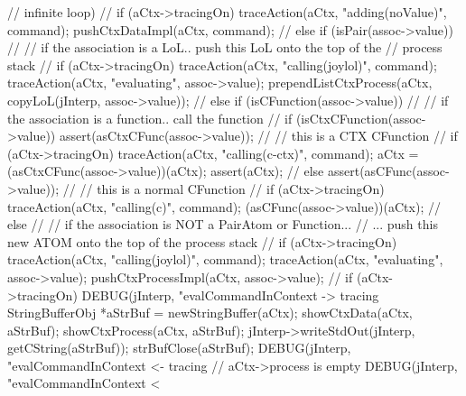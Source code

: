{{{{        // infinite loop)
        //
        if (aCtx->tracingOn)
          traceAction(aCtx, "adding(noValue)", command);
        pushCtxDataImpl(aCtx, command);
        //
      } else if (isPair(assoc->value)) {
        //
        // if the association is a LoL.. push this LoL onto the top of the
        // process stack
        //
        if (aCtx->tracingOn) {
          traceAction(aCtx, "calling(joylol)", command);
          traceAction(aCtx, "evaluating", assoc->value);
        }
        prependListCtxProcess(aCtx,
          copyLoL(jInterp, assoc->value));
        //
      } else if (isCFunction(assoc->value)) {
        //
        // if the association is a function.. call the function
        //
        if (isCtxCFunction(assoc->value)) {
          assert(asCtxCFunc(assoc->value));
          //
          // this is a CTX CFunction
          //
          if (aCtx->tracingOn) 
            traceAction(aCtx, "calling(c-ctx)", command);
          aCtx = (asCtxCFunc(assoc->value))(aCtx);
          assert(aCtx);
          //
        } else {
          assert(asCFunc(assoc->value));
          //
          // this is a normal CFunction
          //
          if (aCtx->tracingOn)
            traceAction(aCtx, "calling(c)", command);
          (asCFunc(assoc->value))(aCtx);
          //
        }
      } else {
        //
        // if the association is NOT a PairAtom or Function...
        // ... push this new ATOM onto the top of the process stack
        //
        if (aCtx->tracingOn) {
          traceAction(aCtx, "calling(joylol)", command);
          traceAction(aCtx, "evaluating", assoc->value);
        }
        pushCtxProcessImpl(aCtx, assoc->value);
        //
      }
    }
    if (aCtx->tracingOn) {
      DEBUG(jInterp, "evalCommandInContext -> tracing%
      StringBufferObj *aStrBuf = newStringBuffer(aCtx);
      showCtxData(aCtx, aStrBuf);
      showCtxProcess(aCtx, aStrBuf);
      jInterp->writeStdOut(jInterp, getCString(aStrBuf));
      strBufClose(aStrBuf);
      DEBUG(jInterp, "evalCommandInContext <- tracing%
    }
  } // aCtx->process is empty
  DEBUG(jInterp, "evalCommandInContext < %
}

\stopCCode